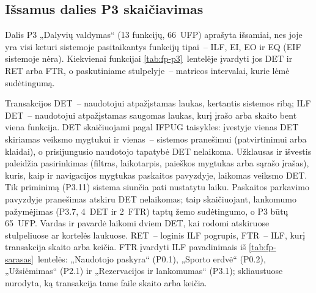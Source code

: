 
\subsection{Išsamus dalies P3 skaičiavimas}\label{sec:priedas-p3}

Dalis P3 „Dalyvių valdymas“ (13 funkcijų, 66~UFP) aprašyta išsamiai, nes
joje yra visi keturi sistemoje pasitaikantys funkcijų tipai~– ILF, EI, EO ir EQ (EIF sistemoje nėra). Kiekvienai
funkcijai \ref{tab:fp-p3}~lentelėje įvardyti jos DET ir RET arba FTR, o
paskutiniame stulpelyje~– matricos intervalai, kurie lėmė sudėtingumą.

Transakcijos DET~– naudotojui atpažįstamas laukas, kertantis sistemos
ribą; ILF DET~– naudotojui atpažįstamas saugomas laukas, kurį įrašo arba
skaito bent viena funkcija. DET skaičiuojami pagal IFPUG taisykles: įvestyje
vienas DET skiriamas veiksmo mygtukui ir vienas~– sistemos pranešimui
(patvirtinimui arba klaidai), o prisijungusio naudotojo tapatybė DET
nelaikoma. Užklausas ir išvestis paleidžia pasirinkimas (filtras,
laikotarpis, paieškos mygtukas arba sąrašo įrašas), kuris, kaip ir
navigacijos mygtukas paskaitos pavyzdyje, laikomas veiksmo DET.
Tik priminimą (P3.11) sistema siunčia pati nustatytu laiku. Paskaitos parkavimo
pavyzdyje pranešimas atskiru DET nelaikomas; taip skaičiuojant, lankomumo
pažymėjimas (P3.7, 4~DET ir 2~FTR) taptų žemo sudėtingumo, o P3 būtų
65~UFP. Vardas ir pavardė laikomi dviem DET, kai rodomi atskiruose stulpeliuose
ar kortelės laukuose.
RET~– loginis ILF pogrupis, FTR~– ILF, kurį transakcija skaito arba keičia.
FTR įvardyti ILF pavadinimais iš \ref{tab:fp-sarasas}~lentelės: „Naudotojo
paskyra“ (P0.1), „Sporto erdvė“ (P0.2), „Užsiėmimas“ (P2.1) ir
„Rezervacijos ir lankomumas“ (P3.1); skliaustuose nurodyta, ką transakcija
tame faile skaito arba keičia.

